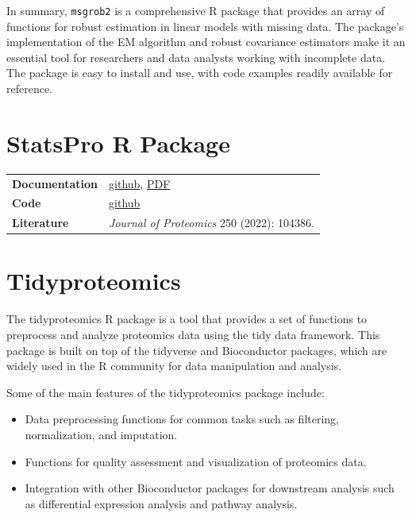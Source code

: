 \documentclass[
]{book}
\providecommand{\tightlist}{%
  \setlength{\itemsep}{0pt}\setlength{\parskip}{0pt}}
\begin{document}
In summary, \texttt{msgrob2} is a comprehensive R package that provides an array of functions for robust estimation in linear models with missing data. The package's implementation of the EM algorithm and robust covariance estimators make it an essential tool for researchers and data analysts working with incomplete data. The package is easy to install and use, with code examples readily available for reference.

\hypertarget{statspro-r-package}{%
\section{StatsPro R Package}\label{statspro-r-package}}

\begin{longtable}[]{@{}
  >{\raggedright\arraybackslash}p{}
  >{\raggedright\arraybackslash}p{}@{}}
\toprule\noalign{}
\endhead
\bottomrule\noalign{}
\endlastfoot
\textbf{Documentation} & \href{https://github.com/YanglabWCH/StatsPro\#Readme}{github}, \href{https://github.com/YanglabWCH/StatsPro/blob/main/StatsPro_Manual.pdf}{PDF} \\
\textbf{Code} & \href{https://github.com/YanglabWCH/StatsPro}{github} \\
\textbf{Literature} & \emph{Journal of Proteomics} 250 (2022): 104386. \\
\end{longtable}

\hypertarget{tidyproteomics}{%
\section{Tidyproteomics}\label{tidyproteomics}}

The tidyproteomics R package is a tool that provides a set of functions to preprocess and analyze proteomics data using the tidy data framework. This package is built on top of the tidyverse and Bioconductor packages, which are widely used in the R community for data manipulation and analysis.

Some of the main features of the tidyproteomics package include:

\begin{itemize}
\tightlist
\item
  Data preprocessing functions for common tasks such as filtering, normalization, and imputation.
\item
  Functions for quality assessment and visualization of proteomics data.
\item
  Integration with other Bioconductor packages for downstream analysis such as differential expression analysis and pathway analysis.
\end{itemize}
\end{document}
